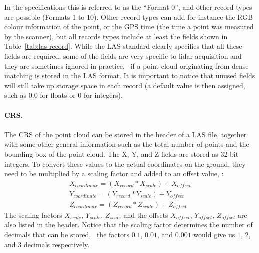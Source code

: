 In the specifications this is referred to as the ``Format 0'', and other record types are possible (Formats 1 to 10).
Other record types can add for instance the RGB colour information of the point, or the GPS time (the time a point was measured by the scanner), but all records types include at least the fields shown in Table~\ref{tab:las-record}.
While the LAS standard clearly specifies that all these fields are required, some of the fields are very specific to lidar acquisition and they are sometimes ignored in practice, \eg\ if a point cloud originating from dense matching is stored in the LAS format.
It is important to notice that unused fields will still take up storage space in each record (a default value is then assigned, such as 0.0 for floats or 0 for integers).

\paragraph{CRS.}
The CRS of the point cloud can be stored in the header of a LAS file, together with some other general information such as the total number of points and the bounding box of the point cloud. 
The X, Y, and Z fields are stored as 32-bit integers. 
To convert these values to the actual coordinates on the ground, they need to be multiplied by a scaling factor and added to an offset value, \ie:
\begin{gather*}
  X_{coordinate} = (X_{record} * X_{scale}) + X_{offset} \\
  Y_{coordinate} = (Y_{record} * Y_{scale}) + Y_{offset} \\
  Z_{coordinate} = (Z_{record} * Z_{scale}) + Z_{offset}
\end{gather*}
The scaling factors $X_{scale}$, $Y_{scale}$, $Z_{scale}$ and the offsets $X_{offset}$, $Y_{offset}$, $Z_{offset}$ are also listed in the header. 
Notice that the scaling factor determines the number of decimals that can be stored, \eg\ the factors $0.1$, $0.01$, and $0.001$ would give us $1$, $2$, and $3$ decimals respectively.

